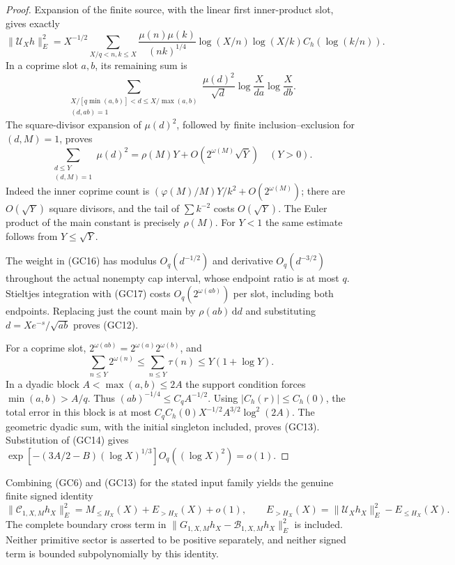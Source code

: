 \documentclass[11pt]{article}
\theoremstyle{remark}\newtheorem{remark}[theorem]{Remark}
\newcommand{\dd}{\,\mathrm d}
\begin{document}
\begin{proof}
Expansion of the finite source, with the linear first
inner-product slot, gives exactly
\[
 \|\mathcal U_Xh\|_E^2=X^{-1/2}
 \sum_{X/q<n,k\le X}
 \frac{\mu(n)\mu(k)}{(nk)^{1/4}}
 \log(X/n)\log(X/k)C_h(\log(k/n)).
 \tag{GC15}
\]
In a coprime slot \(a,b\), its remaining sum is
\[
 \sum_{\substack{X/[q\min(a,b)]<d\le X/\max(a,b)\\(d,ab)=1}}
 \frac{\mu(d)^2}{\sqrt d}
                      \log\frac X{da}\log\frac X{db}.
 \tag{GC16}
\]
The square-divisor expansion of \(\mu(d)^2\), followed by
finite inclusion--exclusion for \((d,M)=1\), proves
\[
 \sum_{\substack{d\le Y\\(d,M)=1}}\mu(d)^2
       =\rho(M)Y+O(2^{\omega(M)}\sqrt Y)
 \quad(Y>0).
 \tag{GC17}
\]
Indeed the inner coprime count is
\((\varphi(M)/M)Y/k^2+O(2^{\omega(M)})\);
there are \(O(\sqrt Y)\) square divisors, and the tail of
\(\sum k^{-2}\) costs \(O(\sqrt Y)\). The Euler product
of the main constant is precisely \(\rho(M)\).
For \(Y<1\) the same estimate follows from \(Y\le\sqrt Y\).

The weight in (GC16) has modulus \(O_q(d^{-1/2})\)
and derivative \(O_q(d^{-3/2})\) throughout the actual
nonempty cap interval, whose endpoint ratio is at most \(q\).
Stieltjes integration with (GC17) costs
\(O_q(2^{\omega(ab)})\) per slot, including both endpoints.
Replacing just the count main by \(\rho(ab)\dd d\) and
substituting \(d=Xe^{-s}/\sqrt{ab}\) proves (GC12).

For a coprime slot,
\(2^{\omega(ab)}=2^{\omega(a)}2^{\omega(b)}\), and
\[
 \sum_{n\le Y}2^{\omega(n)}
 \le\sum_{n\le Y}\tau(n)
 \le Y(1+\log Y).
\]
In a dyadic block \(A<\max(a,b)\le2A\) the support
condition forces \(\min(a,b)>A/q\). Thus
\((ab)^{-1/4}\le C_qA^{-1/2}\).
Using \(|C_h(r)|\le C_h(0)\), the total error in this
block is at most
\(C_q C_h(0)X^{-1/2}A^{3/2}\log^2(2A)\).
The geometric dyadic sum, with the initial singleton
included, proves (GC13). Substitution of (GC14) gives
\(\exp[-(3A/2-B)(\log X)^{1/3}]O_q((\log X)^2)=o(1)\).
\end{proof}

Combining (GC6) and (GC13) for the stated input family yields
the genuine finite signed identity
\[
 \|\mathcal C_{1,X,M}h_X\|_E^2
       =M_{\le H_X}(X)+E_{>H_X}(X)+o(1),\qquad
 E_{>H_X}(X)=\|\mathcal U_Xh_X\|_E^2-E_{\le H_X}(X).
 \tag{GC18}
\]
The complete boundary cross term in
\(\|G_{1,X,M}h_X-\mathcal B_{1,X,M}h_X\|_E^2\)
is included. Neither primitive sector is asserted to be
positive separately, and neither signed term is bounded
subpolynomially by this identity.
\end{document}
